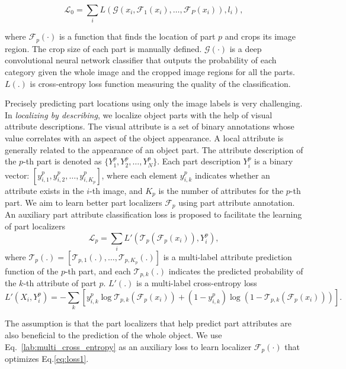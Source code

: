 \documentclass{article}
\begin{document}
\begin{equation}\label{eq:loss1}
\mathcal{L}_0  = \sum_i L(\mathcal{G}(x_i, \mathcal{F}_1(x_i), \dots, \mathcal{F}_P(x_i)), l_i),
\end{equation}

where $\mathcal{F}_p(\cdot)$ is a function that finds the location of part $p$ and crops its image region.
The crop size of each part is manually defined.
$\mathcal{G}(\cdot)$ is a deep convolutional neural network classifier that outputs the probability of each category given the whole image and the cropped image regions for all the parts.
$L(.)$ is cross-entropy loss function measuring the quality of the classification.

Precisely predicting part locations using only the image labels is very challenging.
In {\em localizing by describing}, we localize object parts with the help of visual attribute descriptions.
The visual attribute is a set of binary annotations whose value correlates with an aspect of the object appearance.
A local attribute is generally related to the appearance of an object part.
The attribute description of the $p$-th part is denoted as $\{Y^p_1, Y^p_2, \dots  , Y^p_N\}$.
Each part description $Y^p_i$ is a binary vector: $[y^p_{i,1},y^p_{i,2},\dots,y^p_{i,K_p}]$, where each element $y^p_{i,k}$ indicates whether an attribute exists in the $i$-th image, and $K_p$ is the number of attributes for the $p$-th part.
We aim to learn better part localizers $\mathcal{F}_p$ using part attribute annotation.
An auxiliary part attribute classification loss is proposed to facilitate the learning of part localizers
\begin{equation}
\mathcal{L}_p  = \sum_i L'(\mathcal{T}_p(\mathcal{F}_p(x_i)), Y^p_i),
\end{equation}
where $\mathcal{T}_p(.) = [\mathcal{T}_{p,1}(.),\dots,\mathcal{T}_{p,K_p}(.)]$ is a multi-label attribute prediction function of the $p$-th part, and each $\mathcal{T}_{p,k}(.)$ indicates the predicted probability of the $k$-th attribute of part $p$.
$L'(.)$ is a multi-label cross-entropy loss
\begin{equation}\label{lab:multi_cross_entropy}
L'(X_i, Y^p_i) = -\sum_{k} \left[y^p_{i,k} \log \mathcal{T}_{p,k}(\mathcal{F}_p(x_i)) + (1-y^p_{i,k})\log(1- \mathcal{T}_{p,k}(\mathcal{F}_p(x_i)))\right].
\end{equation}

The assumption is that the part localizers that help predict part attributes are also beneficial to the prediction of the whole object.
We use Eq.~\eqref{lab:multi_cross_entropy} as an auxiliary loss to learn localizer $\mathcal{F}_p(\cdot)$ that optimizes Eq.\eqref{eq:loss1}.
\end{document}
